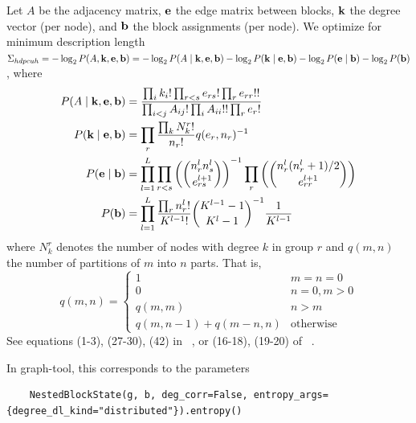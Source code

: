 \documentclass[aps,pre,superscriptaddress]{revtex4}
\begin{document}
Let $A$ be the adjacency matrix, $\vb{e}$ the edge matrix between blocks, $\vb{k}$ the degree vector (per node), and $\vb{b}$ the block assignments (per node).
We optimize for minimum description length $\Sigma_{hdpcuh} = -\log_2P(A, \vb{k}, \vb{e}, \vb{b}) = -\log_2P(A \mid \vb{k}, \vb{e}, \vb{b}) - \log_2 P(\vb{k} \mid \vb{e}, \vb{b}) - \log_2 P(\vb{e} \mid \vb{b}) - \log_2 P(\vb{b}) $, where
\begin{align}
	P(A \mid \vb{k}, \vb{e}, \vb{b}) & = \frac{ \prod_i k_i! \prod_{r < s} e_{rs}! \prod_{r} e_{rr}!!} {\prod_{i < j} A_{ij}! \prod_i A_{ii}!! \prod_r e_r!}                                      \\
	P(\vb{k} \mid \vb{e}, \vb{b})    & = \prod_r \frac{\prod_k N_k^r!}{n_r!} q(e_r, n_r)^{-1}                                                                                                     \\
	P(\vb{e} \mid \vb{b})            & = \prod_{l=1}^{L} \prod_{r < s} \left( \binom{n_r^l n_s^l}{e_{rs}^{l+1}} \right)^{-1} \prod_r \left( \binom{ n_r^l (n_r^l + 1) / 2 }{e_{rr}^{l+1} }\right) \\
	P(\vb{b})                        & = \prod_{l=1}^L \frac{\prod_r n_r^l!}{K^{l-1}!} \binom{ K^{l-1} - 1}{K^l - 1}^{-1} \frac{1}{K^{l-1}}
\end{align}
where $N_k^r$ denotes the number of nodes with degree $k$ in group $r$ and $q(m, n)$ the number of partitions of $m$ into $n$ parts.
That is,
\begin{equation}
	q(m, n) =
	\begin{cases}
		1                         & m = n = 0        \\
		0                         & n = 0, m > 0     \\
		q(m, m)                   & n > m            \\
		q(m, n - 1) + q(m - n, n) & \text{otherwise}
	\end{cases}
\end{equation}
See equations (1-3), (27-30), (42) in ~\cite{peixoto17-01}, or (16-18), (19-20) of ~\cite{funke19-04}.

In graph-tool, this corresponds to the parameters
\begin{verbatim}
    NestedBlockState(g, b, deg_corr=False, entropy_args={degree_dl_kind="distributed"}).entropy()
\end{verbatim}

\clearpage


\end{document}
